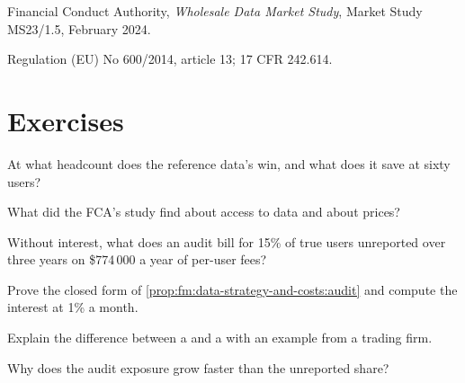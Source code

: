 \begin{omsources}
\item Financial Conduct Authority, \emph{Wholesale Data Market Study}, Market Study MS23/1.5, February 2024.
\item Regulation (EU) No 600/2014, article 13; 17 CFR 242.614.
\end{omsources}

\section{Exercises}

\begin{exercise}[$\star$]\label{exo:fm:data-strategy-and-costs:1}
At what headcount does the reference data's  win, and what does it save at sixty users?
\end{exercise}

\begin{exercise}[$\star$]\label{exo:fm:data-strategy-and-costs:2}
What did the FCA's study find about access to data and about prices?
\end{exercise}

\begin{exercise}[$\star$]\label{exo:fm:data-strategy-and-costs:3}
Without interest, what does an audit bill for 15\% of true users unreported over three years on \$774\,000 a year of per-user fees?
\end{exercise}

\begin{exercise}[$\star\star$]\label{exo:fm:data-strategy-and-costs:4}
Prove the closed form of \cref{prop:fm:data-strategy-and-costs:audit} and compute the interest at 1\% a month.
\end{exercise}

\begin{exercise}[$\star\star$]\label{exo:fm:data-strategy-and-costs:5}
Explain the difference between a  and a  with an example from a trading firm.
\end{exercise}

\begin{exercise}[$\star\star$]\label{exo:fm:data-strategy-and-costs:6}
Why does the audit exposure grow faster than the unreported share?
\end{exercise}

